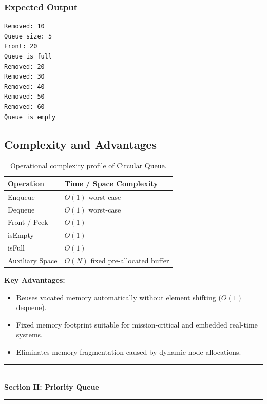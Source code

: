 \subsubsection{Expected Output}
\begin{lstlisting}[style=pseudocode]
Removed: 10
Queue size: 5
Front: 20
Queue is full
Removed: 20
Removed: 30
Removed: 40
Removed: 50
Removed: 60
Queue is empty
\end{lstlisting}

\subsection{Complexity and Advantages}

\begin{table}[htbp]
\centering
\small
\begin{tabularx}{0.75\textwidth}{l X}
\toprule
\textbf{Operation} & \textbf{Time / Space Complexity} \\
\midrule
Enqueue      & $O(1)$ worst-case \\
Dequeue      & $O(1)$ worst-case \\
Front / Peek & $O(1)$ \\
isEmpty      & $O(1)$ \\
isFull       & $O(1)$ \\
Auxiliary Space & $O(N)$ fixed pre-allocated buffer \\
\bottomrule
\end{tabularx}
\caption{Operational complexity profile of Circular Queue.}
\end{table}

\textbf{Key Advantages:}
\begin{itemize}
    \item Reuses vacated memory automatically without element shifting ($O(1)$ dequeue).
    \item Fixed memory footprint suitable for mission-critical and embedded real-time systems.
    \item Eliminates memory fragmentation caused by dynamic node allocations.
\end{itemize}

\begin{center}
\vspace{1em}
{\color{primary}\rule{0.45\textwidth}{1.2pt}}\\[4pt]
{\Large\bfseries\color{primary} Section II: Priority Queue}\\[2pt]
{\color{primary}\rule{0.45\textwidth}{1.2pt}}
\vspace{0.5em}
\end{center}

